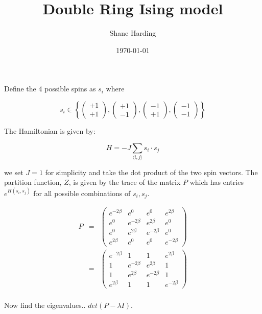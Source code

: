 \documentclass[fleqn]{article}
\title{Double Ring Ising model}
\author{Shane Harding}
\date{\today}
\begin{document}
\maketitle

Define the 4 possible spins as $s_i$ where

\[ s_i \in \left\{ \left( \begin{array}{c} +1 \\ +1 \end{array} \right),
\left( \begin{array}{c} +1 \\ -1 \end{array} \right),
\left( \begin{array}{c} -1 \\ +1 \end{array} \right),
\left( \begin{array}{c} -1 \\ -1 \end{array} \right) \right\} \]

The Hamiltonian is given by:

\[ H = -J \sum_{\langle i, j \rangle} s_i \cdot s_j \]

we set $J=1$ for simplicity and take the dot product of the two spin vectors. The partition function, $Z$, is given by the trace of the matrix $P$ which has entries $e^{H(s_i, s_j)}$ for all possible combinations of $s_i, s_j$.

\begin{align}
P &=& \left( \begin{array}{cccc} e^{-2 \beta} & e^0 & e^0 & e^{2 \beta} \\
e^0 & e^{-2 \beta} & e^{2 \beta} & e^0 \\
e^0 & e^{2 \beta} & e^{-2 \beta} & e^0 \\
e^{2 \beta} & e^0 & e^0 & e^{-2 \beta} \end{array} \right) \\
&=& \left( \begin{array}{cccc} e^{-2 \beta} & 1 & 1 & e^{2 \beta} \\
1 & e^{-2 \beta} & e^{2 \beta} & 1 \\
1 & e^{2 \beta} & e^{-2 \beta} & 1 \\
e^{2 \beta} & 1 & 1 & e^{-2 \beta} \end{array} \right) \\
\end{align}

Now find the eigenvalues.. $det(P-\lambda I)$.
\end{document}
